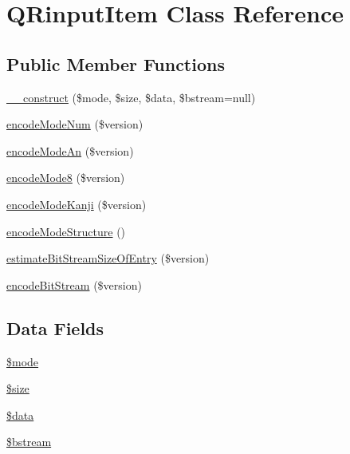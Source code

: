 \hypertarget{class_q_rinput_item}{\section{Q\-Rinput\-Item Class Reference}
\label{class_q_rinput_item}
}
\subsection*{Public Member Functions}
\begin{DoxyCompactItemize}
\item 
\hyperlink{class_q_rinput_item_a582708ef587a898ec73e89ea3b2c95a4}{\-\_\-\-\_\-construct} (\$mode, \$size, \$data, \$bstream=null)
\item 
\hyperlink{class_q_rinput_item_a9cff91f5eaff725ab83292c638570576}{encode\-Mode\-Num} (\$version)
\item 
\hyperlink{class_q_rinput_item_a39a037fae62a75ef3b8e8aef308e83dd}{encode\-Mode\-An} (\$version)
\item 
\hyperlink{class_q_rinput_item_aced01286adc43771e04fa4a880e36591}{encode\-Mode8} (\$version)
\item 
\hyperlink{class_q_rinput_item_a29fe7f8ce6ae4fe74371d3be05137c96}{encode\-Mode\-Kanji} (\$version)
\item 
\hyperlink{class_q_rinput_item_ac7019c24096b3e01be79cc946a29ca51}{encode\-Mode\-Structure} ()
\item 
\hyperlink{class_q_rinput_item_a262908e3e3ced6b6c025ef1938a1eeb3}{estimate\-Bit\-Stream\-Size\-Of\-Entry} (\$version)
\item 
\hyperlink{class_q_rinput_item_a8029b3f8efe3074259d9eb2aa03f59b9}{encode\-Bit\-Stream} (\$version)
\end{DoxyCompactItemize}
\subsection*{Data Fields}
\begin{DoxyCompactItemize}
\item 
\hyperlink{class_q_rinput_item_a3aaf40baac36e278c7d7c9139df1750c}{\$mode}
\item 
\hyperlink{class_q_rinput_item_af594986e4618a8d6a5d7566617f583c6}{\$size}
\item 
\hyperlink{class_q_rinput_item_a6efc15b5a2314dd4b5aaa556a375c6d6}{\$data}
\item 
\hyperlink{class_q_rinput_item_a47bd4f599ed9040fc99add392968e3b0}{\$bstream}
\end{DoxyCompactItemize}


